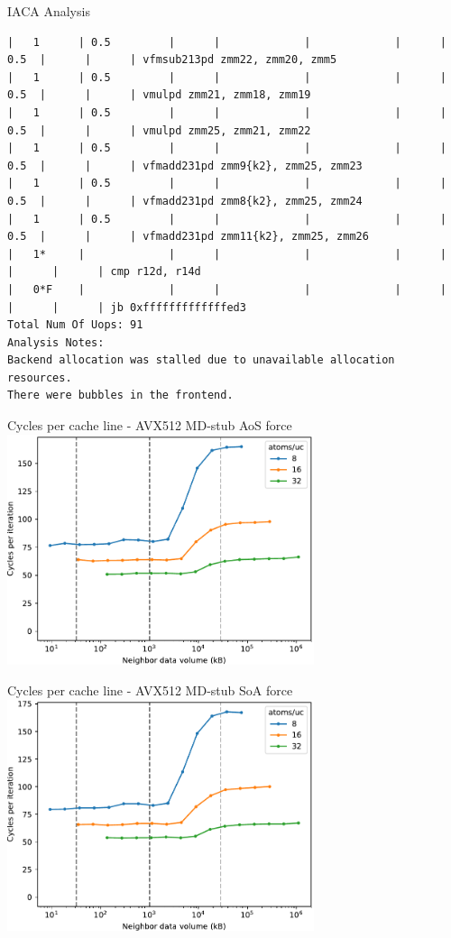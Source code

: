 \documentclass[aspectratio=169,t]{beamer}
\begin{document}
  \begin{frame}[fragile]{IACA Analysis}
    \vspace{-20pt}
    \begin{lstlisting}[basicstyle=\tt\fontsize{4pt}{6pt}\selectfont]
|   1      | 0.5         |      |             |             |      | 0.5  |      |      | vfmsub213pd zmm22, zmm20, zmm5
|   1      | 0.5         |      |             |             |      | 0.5  |      |      | vmulpd zmm21, zmm18, zmm19
|   1      | 0.5         |      |             |             |      | 0.5  |      |      | vmulpd zmm25, zmm21, zmm22
|   1      | 0.5         |      |             |             |      | 0.5  |      |      | vfmadd231pd zmm9{k2}, zmm25, zmm23
|   1      | 0.5         |      |             |             |      | 0.5  |      |      | vfmadd231pd zmm8{k2}, zmm25, zmm24
|   1      | 0.5         |      |             |             |      | 0.5  |      |      | vfmadd231pd zmm11{k2}, zmm25, zmm26
|   1*     |             |      |             |             |      |      |      |      | cmp r12d, r14d
|   0*F    |             |      |             |             |      |      |      |      | jb 0xfffffffffffffed3
Total Num Of Uops: 91
Analysis Notes:
Backend allocation was stalled due to unavailable allocation resources.
There were bubbles in the frontend.
    \end{lstlisting}
  \end{frame}

  \begin{frame}[fragile]{Cycles per cache line - AVX512 MD-stub AoS force}
    \includegraphics[width=9cm]{results_aos_casclakesp2_neighbor_vol.pdf}
  \end{frame}

  \begin{frame}[fragile]{Cycles per cache line - AVX512 MD-stub SoA force}
    \includegraphics[width=9cm]{results_soa_casclakesp2_neighbor_vol.pdf}
  \end{frame}
\end{document}
